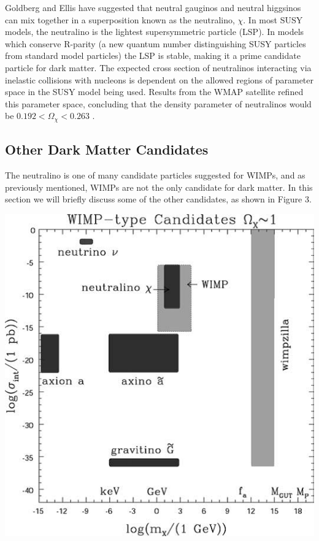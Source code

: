 \documentclass[a4paper,12pt]{article}
\begin{document}
Goldberg \cite{Goldberg} and Ellis \cite{Ellis} have suggested that neutral gauginos and neutral higgsinos can mix together in a superposition known as the neutralino, $\chi$.  In most SUSY models, the neutralino is the lightest supersymmetric particle (LSP).  In models which conserve R-parity (a new quantum number distinguishing SUSY particles from standard model particles) the LSP is stable, making it a prime candidate particle for dark matter.  The expected cross section of neutralinos interacting via inelastic collisions with nucleons is dependent on the allowed regions of parameter space in the SUSY model being used.  Results from the WMAP satellite refined this parameter space, concluding that the density parameter of neutralinos would be  $0.192 < \Omega_\chi < 0.263$ \cite{Spergel,Bennett,Arnowitt}.

\subsection{Other Dark Matter Candidates}

The neutralino is one of many candidate particles suggested for WIMPs, and as previously mentioned, WIMPs are not the only candidate for dark matter.  In this section we will briefly discuss some of the other candidates, as shown in Figure 3.

\begin{center}
\includegraphics[scale=0.7]{DMCandidates.png}
\end{center}
\end{document}
